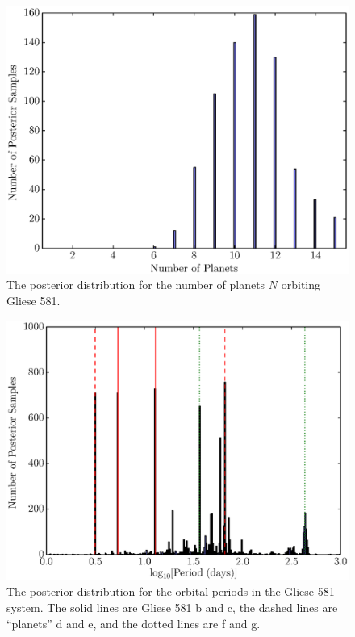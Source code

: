 \documentclass[useAMS,usenatbib]{mn2e}
\begin{document}
\begin{figure}
\includegraphics[scale=0.45]{Figures/gliese581_N.eps}
\caption{The posterior distribution for the number of planets $N$ orbiting
Gliese 581.\label{fig:gliese581_N}}
\end{figure}

\begin{figure}
\includegraphics[scale=0.45]{Figures/gliese581_periods.eps}
\caption{The posterior distribution for the orbital periods in the Gliese 581
system. The solid lines are Gliese 581 b and c, the dashed lines are
``planets'' d and e, and the dotted lines are f and g.
\label{fig:gliese581_periods}}
\end{figure}
\end{document}
